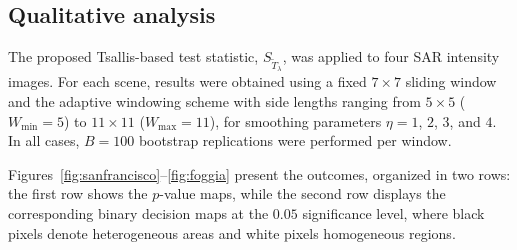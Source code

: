 \documentclass[
  lettersize  journal,
]{IEEEtran}%
\begin{document}
\subsection{Qualitative analysis}\label{qualitative-analysis}

The proposed Tsallis-based test statistic,
\(S_{\widetilde{T}_{\lambda}}\), was applied to four SAR intensity
images. For each scene, results were obtained using a fixed \(7\times7\)
sliding window and the adaptive windowing scheme with side lengths
ranging from \(5\times5\) (\(W_{\min}=5\)) to \(11\times11\)
(\(W_{\max}=11\)), for smoothing parameters \(\eta=1\), \(2\), \(3\),
and \(4\). In all cases, \(B=100\) bootstrap replications were performed
per window.

Figures~\ref{fig:sanfrancisco}--\ref{fig:foggia} present the outcomes,
organized in two rows: the first row shows the \(p\)-value maps, while
the second row displays the corresponding binary decision maps at the
\(0.05\) significance level, where black pixels denote heterogeneous
areas and white pixels homogeneous regions.

\setlength{\dblfloatsep}{4pt}      
\setlength{\dbltextfloatsep}{4pt}  
\setlength{\textfloatsep}{4pt}
\captionsetup{font=footnotesize}
\captionsetup[sub]{aboveskip=1pt,belowskip=1pt}
\end{document}

